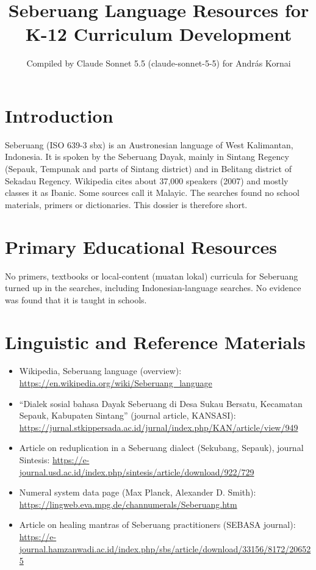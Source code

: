 \documentclass[12pt]{article}
\title{Seberuang Language Resources for K-12 Curriculum Development}
\author{Compiled by Claude Sonnet 5.5 (claude-sonnet-5-5) for Andr\'as Kornai}
\date{}
\begin{document}
\maketitle

\section{Introduction}
Seberuang (ISO 639-3 sbx) is an Austronesian language of West Kalimantan, Indonesia. It is spoken by the Seberuang Dayak, mainly in Sintang Regency (Sepauk, Tempunak and parts of Sintang district) and in Belitang district of Sekadau Regency. Wikipedia cites about 37,000 speakers (2007) and mostly classes it as Ibanic. Some sources call it Malayic. The searches found no school materials, primers or dictionaries. This dossier is therefore short.

\section{Primary Educational Resources}
No primers, textbooks or local-content (muatan lokal) curricula for Seberuang turned up in the searches, including Indonesian-language searches. No evidence was found that it is taught in schools.

\section{Linguistic and Reference Materials}
\begin{itemize}
\item Wikipedia, Seberuang language (overview): \url{https://en.wikipedia.org/wiki/Seberuang_language}
\item ``Dialek sosial bahasa Dayak Seberuang di Desa Sukau Bersatu, Kecamatan Sepauk, Kabupaten Sintang'' (journal article, KANSASI): \url{https://jurnal.stkippersada.ac.id/jurnal/index.php/KAN/article/view/949}
\item Article on reduplication in a Seberuang dialect (Sekubang, Sepauk), journal Sintesis: \url{https://e-journal.usd.ac.id/index.php/sintesis/article/download/922/729}
\item Numeral system data page (Max Planck, Alexander D. Smith): \url{https://lingweb.eva.mpg.de/channumerals/Seberuang.htm}
\item Article on healing mantras of Seberuang practitioners (SEBASA journal): \url{https://e-journal.hamzanwadi.ac.id/index.php/sbs/article/download/33156/8172/206525}
\end{itemize}
\end{document}
